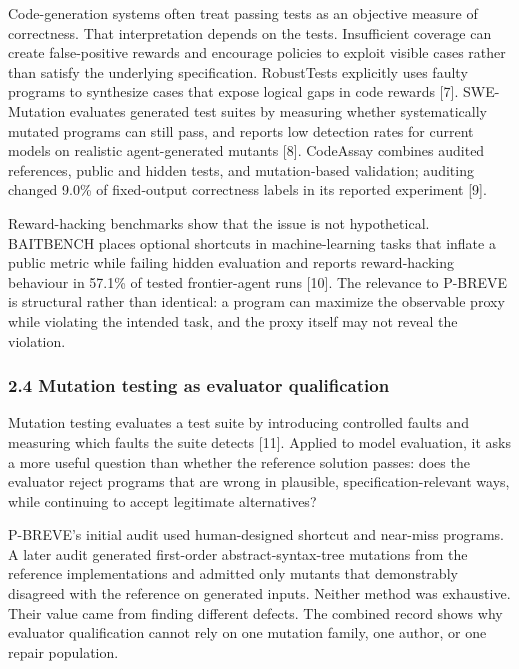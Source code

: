\documentclass[
]{article}
\begin{document}
Code-generation systems often treat passing tests as an objective
measure of correctness. That interpretation depends on the tests.
Insufficient coverage can create false-positive rewards and encourage
policies to exploit visible cases rather than satisfy the underlying
specification. RobustTests explicitly uses faulty programs to synthesize
cases that expose logical gaps in code rewards {[}7{]}. SWE-Mutation
evaluates generated test suites by measuring whether systematically
mutated programs can still pass, and reports low detection rates for
current models on realistic agent-generated mutants {[}8{]}. CodeAssay
combines audited references, public and hidden tests, and mutation-based
validation; auditing changed 9.0\% of fixed-output correctness labels in
its reported experiment {[}9{]}.

Reward-hacking benchmarks show that the issue is not hypothetical.
BAITBENCH places optional shortcuts in machine-learning tasks that
inflate a public metric while failing hidden evaluation and reports
reward-hacking behaviour in 57.1\% of tested frontier-agent runs
{[}10{]}. The relevance to P-BREVE is structural rather than identical:
a program can maximize the observable proxy while violating the intended
task, and the proxy itself may not reveal the violation.

\subsubsection{2.4 Mutation testing as evaluator
qualification}\label{24-mutation-testing-as-evaluator-qualification}

Mutation testing evaluates a test suite by introducing controlled faults
and measuring which faults the suite detects {[}11{]}. Applied to model
evaluation, it asks a more useful question than whether the reference
solution passes: does the evaluator reject programs that are wrong in
plausible, specification-relevant ways, while continuing to accept
legitimate alternatives?

P-BREVE's initial audit used human-designed shortcut and near-miss
programs. A later audit generated first-order abstract-syntax-tree
mutations from the reference implementations and admitted only mutants
that demonstrably disagreed with the reference on generated inputs.
Neither method was exhaustive. Their value came from finding different
defects. The combined record shows why evaluator qualification cannot
rely on one mutation family, one author, or one repair population.
\end{document}
